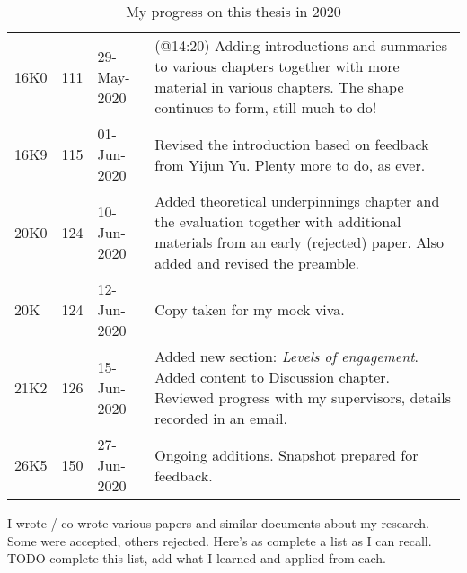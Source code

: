 \begin{table}[htpb]
\begin{adjustbox}{width=\textwidth}
\begin{tabular}{p{}p{}p{}p{}}
         16K0 &111 &29-May-2020 &(@14:20) Adding introductions and summaries to various chapters together with more material in various chapters. The shape continues to form, still much to do!\\
         16K9 &115 &01-Jun-2020 &Revised the introduction based on feedback from Yijun Yu. Plenty more to do, as ever.\\
         20K0 &124 &10-Jun-2020 &Added theoretical underpinnings chapter and the evaluation together with additional materials from an early (rejected) paper. Also added and revised the preamble.\\
         20K  &124 &12-Jun-2020 &Copy taken for my mock viva.\\
         21K2 &126 &15-Jun-2020 &Added new section: \emph{Levels of engagement}. Added content to Discussion chapter. Reviewed progress with my supervisors, details recorded in an email.\\
         26K5 &150 &27-Jun-2020 &Ongoing additions. Snapshot prepared for feedback.\\
         
    \end{tabular}
    \end{adjustbox}
    \caption{My progress on this thesis in 2020}
    \label{tab:my_progress_on_this_thesis_2020}
\end{table}

I wrote / co-wrote various papers and similar documents about my research. Some were accepted, others rejected. Here's as complete a list as I can recall. TODO complete this list, add what I learned and applied from each.

